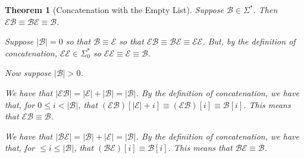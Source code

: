 \documentclass[12pt]{article}
\theoremstyle{break}
\theoremstyle{break}
\newtheorem{theorem}{Theorem}[section]
\theoremstyle{break}
\theoremstyle{break}
\theoremstyle{break}
\newtheorem{informal definition}[definition]{Informal Definition}
\newcommand{\mc}[1]{\mathcal{#1}}
\begin{document}
\begin{theorem}[Concatenation with the Empty List]
Suppose $\mc{B}\in\Sigma^*$.
Then $\mc{E}\mc{B} \equiv \mc{B} \mc{E} \equiv \mc{B}$.

Suppose $|\mc{B}|= 0$ so that $\mc{B}\equiv \mc{E}$ so that $\mc{E}\mc{B} \equiv \mc{B}\mc{E} \equiv \mc{E}\mc{E}$.
But, by the definition of concatenation, $\mc{E}\mc{E}\in\Sigma_0^*$ so $\mc{E}\mc{E}\equiv \mc{E}\equiv \mc{B}$.

Now suppose $|\mc{B}|>0$.

We have that $|\mc{E}\mc{B}| = |\mc{E}| + |\mc{B}| = |\mc{B}|$.
By the definition of concatenation, we have that, for $0 \le i < |\mc{B}|$, that $(\mc{E}\mc{B})[|\mc{E}| + i] \equiv (\mc{E}\mc{B})[i] \equiv \mc{B}[i]$.
This means that $\mc{E}\mc{B}\equiv\mc{B}$.

We have that $|\mc{B}\mc{E}| = |\mc{B}| + |\mc{E}| = |\mc{B}|$.
By the definition of concatenation, we have that, for $\le i \le |\mc{B}|$, that $(\mc{B}\mc{E})[i] \equiv \mc{B}[i]$.
This means that $\mc{B}\mc{E}\equiv \mc{B}$.
\end{theorem}
\end{document}

